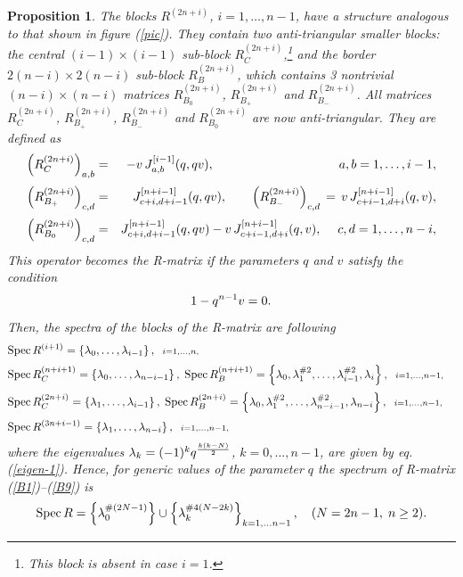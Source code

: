 \documentclass[11pt]{article}
\def\be{\begin{equation}}\def\ee{\end{equation}}
\def\ba{\begin{eqnarray}}\def\ea{\end{eqnarray}}
\newcounter{theorem}\def\thetheorem{\thesection.\arabic{theorem}}\makeatletter
\newtheorem{prop}[theorem]{Proposition}
\begin{document}
\begin{prop}
The blocks  $R^{(2n+i)}$, $i=1,\dots ,n-1$, have a structure analogous to that shown in  figure (\ref{pic}). They contain two anti-triangular smaller blocks:
the central $(i-1)\times (i-1)$ sub-block $R_{C}^{(2n+i)}$,\footnote{This block is absent in case $i=1$.} and the border $2(n-i)\times 2(n-i)$ sub-block $R_{B}^{(2n+i)}$, which contains 3 nontrivial $(n-i)\times (n-i)$ matrices 
$R_{B_0}^{(2n+i)}$, $R_{B_+}^{(2n+i)}$ and $R_{B_-}^{(2n+i)}$. All matrices
$R_{C}^{(2n+i)}$, $R_{B_+}^{(2n+i)}$, $R_{B_-}^{(2n+i)}$  and $R_{B_0}^{(2n+i)}$ are now anti-triangular.
They are defined as
\ba
\lb{B7}
\left(R_{C}^{(2n+i)}\right)_{a,b} &=& -v\, J^{[i-1]}_{a,b}(q,q v), \qquad \qquad \qquad \qquad\qquad a,b=1,\dots , i-1,
\\[2pt]
\lb{B8}
\left(R_{B_+}^{(2n+i)}\right)_{c,d} &=& J^{[n+i-1]}_{c+i,d+i-1}(q,qv), \qquad
\left(R_{B_-}^{(2n+i)}\right)_{c,d} \,=\, v\, J^{[n+i-1]}_{c+i-1,d+i}(q,v),
\\[2pt]
\lb{B9}
\left(R_{B_0}^{(2n+i)}\right)_{c,d} &=&  J^{[n+i-1]}_{c+i,d+i-1}(q,q v) -  v\, J^{[n+i-1]}_{c+i-1,d+i}(q,v),\quad\;  c,d= 1,\dots , n-i,
\ea
This operator becomes the R-matrix if the parameters $q$ and $v$ satisfy the condition	
\be 
\lb{restrict-B}
1-q^{n-1} v=0.
\ee	
Then, the spectra of the blocks of the R-matrix are following
\ba
\lb{specR-b1}
&
{\rm Spec\,} R^{(i+1)} = \left\{  \lambda_0,\dots ,\lambda_{i-1}  \right\}, \;\; {\scriptstyle i=1,\dots ,n,}
&
\\[2pt]
&
\lb{specR-b2}
{\rm Spec\,} R_{C}^{(n+i+1)} = \left\{  \lambda_0,\dots ,
\lambda_{n-i-1}   \right\},\; 
{\rm Spec\,} R_{B}^{(n+i+1)} = \left\{  \lambda_0,\lambda_1^{\# 2},\dots ,   \lambda_{i-1}^{\# 2},\lambda_i\right\}, \;\; {\scriptstyle i=1,\dots ,n-1,}
\\[2pt]
\lb{specR-b3}
&
{\rm Spec\,} R_{C}^{(2n+i)} = \left\{  \lambda_1,\dots ,
\lambda_{i-1}   \right\},\; 
{\rm Spec\,} R_{B}^{(2n+i)} = \left\{  \lambda_0,\lambda_1^{\# 2},\dots ,   \lambda_{n-i-1}^{\# 2},\lambda_{n-i}\right\}, \;\; {\scriptstyle i=1,\dots ,n-1,}
&
\\[2pt]
\lb{specR-b4}
&
{\rm Spec\,} R^{(3n+i-1)} = \left\{  \lambda_1,\dots ,\lambda_{n-i}  \right\}, \;\; {\scriptstyle i=1,\dots ,n-1,}
&
\ea
where the eigenvalues $\lambda_k=(-1)^k q^{k(k-N)\over 2}$, $k=0,\dots ,n-1$, are given by eq. (\ref{eigen-1}). Hence, for generic values of the parameter $q$ the spectrum of R-matrix (\ref{B1})--(\ref{B9}) is
\be 
\lb{specR-B}
{\rm Spec\,} R = \left\{ \lambda_0^{\#(2N-1)}\right\}\cup
\left\{ \lambda_k^{\# 4(N-2k)}   \right\}_{k=1,\dots n-1}, \quad (N=2n-1,\; n\geq 2).
\ee
\end{prop}
\end{document}
